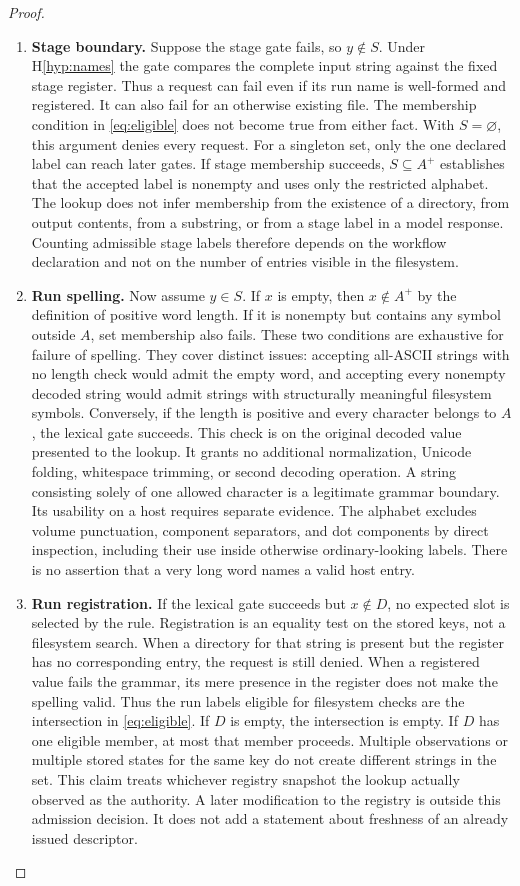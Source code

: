 \documentclass[12pt]{article}
\begin{document}
\begin{proof}
\begin{enumerate}
\item \textbf{Stage boundary.}
Suppose the stage gate fails, so $y\notin S$. Under
H\ref{hyp:names} the gate compares the complete input string against
the fixed stage register. Thus a request can fail even if its run
name is well-formed and registered. It can also fail for an otherwise
existing file. The membership condition in \eqref{eq:eligible} does
not become true from either fact. With $S=\varnothing$, this argument
denies every request. For a singleton set, only the one declared label
can reach later gates. If stage membership succeeds, $S\subseteq A^+$
establishes that the accepted label is nonempty and uses only the
restricted alphabet. The lookup does not infer membership from the
existence of a directory, from output contents, from a substring, or
from a stage label in a model response. Counting admissible stage
labels therefore depends on the workflow declaration and not on the
number of entries visible in the filesystem.

\item \textbf{Run spelling.}
Now assume $y\in S$. If $x$ is empty, then $x\notin A^+$ by the
definition of positive word length. If it is nonempty but contains
any symbol outside $A$, set membership also fails. These two
conditions are exhaustive for failure of spelling. They cover distinct
issues: accepting all-ASCII strings with no length check would
admit the empty word, and accepting every nonempty decoded string
would admit strings with structurally meaningful filesystem symbols.
Conversely, if the length is positive and every character belongs to
$A$, the lexical gate succeeds. This check is on the original decoded
value presented to the lookup. It grants no additional normalization,
Unicode folding, whitespace trimming, or second decoding operation.
A string consisting solely of one allowed character is a legitimate
grammar boundary. Its usability on a host requires separate evidence.
The alphabet excludes volume punctuation, component separators, and
dot components by direct inspection, including their use inside
otherwise ordinary-looking labels. There is no assertion that a very
long word names a valid host entry.

\item \textbf{Run registration.}
If the lexical gate succeeds but $x\notin D$, no expected slot is
selected by the rule. Registration is an equality test on the stored
keys, not a filesystem search. When a directory for that string is
present but the register has no corresponding entry, the request is
still denied. When a registered value fails the grammar, its mere
presence in the register does not make the spelling valid. Thus the
run labels eligible for filesystem checks are the intersection in
\eqref{eq:eligible}. If $D$ is empty, the intersection is empty.
If $D$ has one eligible member, at most that member proceeds.
Multiple observations or multiple stored states for the same key do
not create different strings in the set. This claim treats whichever
registry snapshot the lookup actually observed as the authority.
A later modification to the registry is outside this admission
decision. It does not add a statement about freshness of an already
issued descriptor.


\end{enumerate}
\end{proof}
\end{document}
